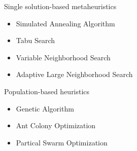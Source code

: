     \begin{frame}{Single solution-based metaheuristics}
      \begin{itemize}
        \item Simulated Annealing Algorithm
        \item Tabu Search
        \item Variable Neighborhood Search
        \item Adaptive Large Neighborhood Search
      \end{itemize}
    \end{frame}

    \begin{frame}{Population-based heuristics}
      \begin{itemize}
        \item Genetic Algorithm
        \item Ant Colony Optimization
        \item Partical Swarm Optimization
      \end{itemize}
    \end{frame}

